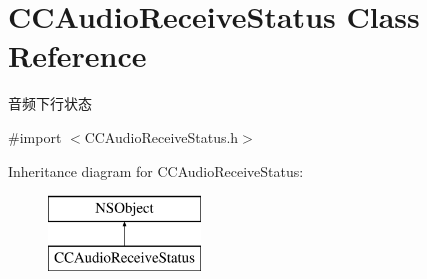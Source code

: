 \hypertarget{interface_c_c_audio_receive_status}{}\section{C\+C\+Audio\+Receive\+Status Class Reference}
\label{interface_c_c_audio_receive_status}


音频下行状态  




{\ttfamily \#import $<$C\+C\+Audio\+Receive\+Status.\+h$>$}

Inheritance diagram for C\+C\+Audio\+Receive\+Status\+:\begin{figure}[H]
\begin{center}
\leavevmode
\includegraphics[height=2.000000cm]{interface_c_c_audio_receive_status}
\end{center}
\end{figure}
